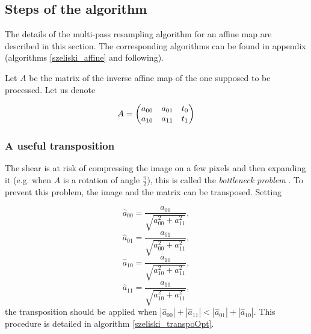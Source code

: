 \subsection{Steps of the algorithm}
	\label{szeliski_affine_section}
	
	The details of the multi-pass resampling algorithm for an affine map are described in this section. The corresponding algorithms can be found in appendix (algorithms \ref{szeliski_affine} and following).
	
	Let $A$ be the matrix of the inverse affine map of the one supposed to be processed. Let us denote

\[A = \begin{pmatrix} a_{00} & a_{01} & t_0\\ a_{10} & a_{11} & t_1 \end{pmatrix}\]

	
	
	
	\subsubsection{A useful transposition}
		\label{szeliski_transpoOpt_section}
		
		The shear is at risk of compressing the image on a few pixels and then expanding it (e.g. when $A$ is a rotation of angle $\frac{\pi}{2}$), this is called the \emph{bottleneck problem} \cite{wolberg1990digital}. To prevent this problem, the image and the matrix can be transposed. Setting
		
		
		\[\hat a_{00} = \frac{a_{00}}{\sqrt{a_{00}^2+a_{11}^2}},\]
		\[\hat a_{01} = \frac{a_{01}}{\sqrt{a_{00}^2+a_{11}^2}},\]
		\[\hat a_{10} = \frac{a_{10}}{\sqrt{a_{10}^2+a_{11}^2}},\]
		\[\hat a_{11} = \frac{a_{11}}{\sqrt{a_{10}^2+a_{11}^2}},\]
		the transposition should be applied when $|\hat a_{00}|+|\hat a_{11}|<|\hat a_{01}|+|\hat a_{10}|$.
		This procedure is detailed in algorithm \ref{szeliski_transpoOpt}.
		
